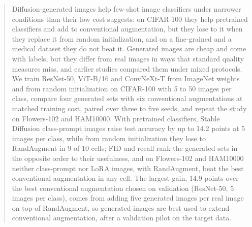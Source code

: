 \begin{abstract}
Diffusion-generated images help few-shot image classifiers under narrower conditions than their low cost
suggests: on CIFAR-100 they help pretrained classifiers and add to conventional augmentation, but they lose to it
when they replace it from random initialization, and on a fine-grained and a medical dataset they do not beat
it. Generated images are cheap and come with labels, but they differ from real images
in ways that standard quality measures miss, and earlier studies compared them under mixed protocols. We train
ResNet-50, ViT-B/16 and ConvNeXt-T from ImageNet weights and from random initialization on CIFAR-100 with 5 to 50
images per class, compare four generated sets with six conventional augmentations at matched training cost,
paired over three to five seeds, and repeat the study on Flowers-102 and HAM10000. With pretrained classifiers,
Stable Diffusion class-prompt images raise test accuracy by up to 14.2 points at 5 images per class, while from
random initialization they lose to RandAugment in 9 of 10 cells; FID and recall rank the generated sets in the
opposite order to their usefulness, and on Flowers-102 and HAM10000 neither class-prompt nor LoRA images, with RandAugment,
beat the best conventional augmentation in any cell. The largest gain, 14.9 points over the best conventional augmentation chosen on
validation (ResNet-50, 5 images per class), comes from adding five generated images per real image on top of
RandAugment, so generated images are best used to extend conventional augmentation, after a validation pilot on
the target data.
\end{abstract}
